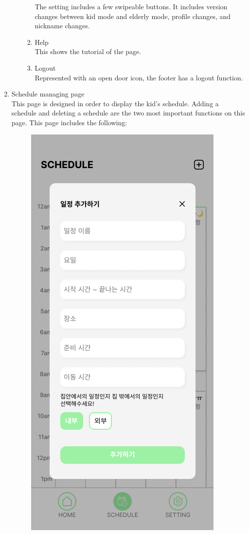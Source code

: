 \documentclass[conference]{IEEEtran}
\begin{document}
\begin{enumerate}[label=\arabic*.]
\begin{enumerate}[label=\alph*.]
\begin{enumerate}[label=\roman*.]
            The setting includes a few swipeable buttons. It includes version changes between kid mode and elderly mode, profile changes, and nickname changes. 
            \item {\large{Help}}\\
            This shows the tutorial of the page.
            \item {\large{Logout}}\\
            Represented with an open door icon, the footer has a logout function. \\
            \end{enumerate}            
    \end{enumerate}
    \item {\large{Schedule managing page}} \\
    This page is designed in order to display the kid’s schedule. Adding a schedule and deleting a schedule are the two most important functions on this page. This page includes the following: \\
    \begin{figure}[H]\centering\includegraphics[scale=0.3]{images/add.png}\end{figure} 

\end{enumerate}
\end{document}
